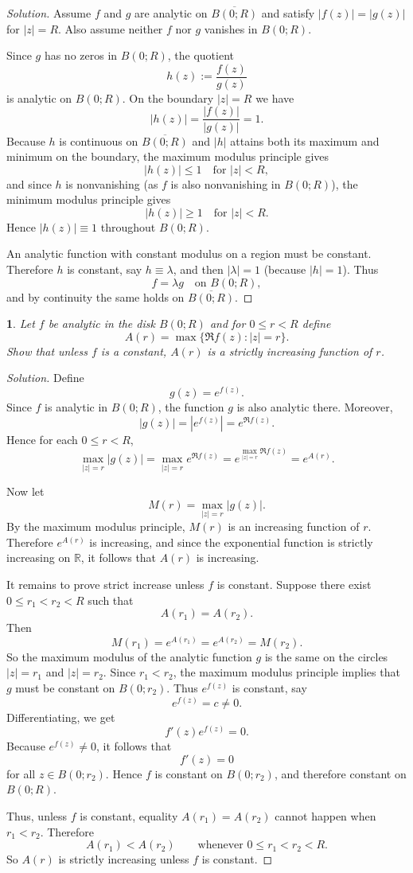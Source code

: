\documentclass[12pt, a4paper]{report}
\theoremstyle{spaced}
\newtheorem{exercise}{}
\newcommand{\setexercise}[1]{\setcounter{exercise}{#1-1}}
\begin{document}
\begin{proof}[Solution]
	Assume $f$ and $g$ are analytic on $\overline{B(0;R)}$ and satisfy $|f(z)|=|g(z)|$ for $|z|=R$. Also assume neither $f$ nor $g$ vanishes in $B(0;R)$.

	Since $g$ has no zeros in $B(0;R)$, the quotient
	\[
		h(z):=\frac{f(z)}{g(z)}
	\]
	is analytic on $B(0;R)$. On the boundary $|z|=R$ we have
	\[
		|h(z)|=\frac{|f(z)|}{|g(z)|}=1.
	\]
	Because $h$ is continuous on $\overline{B(0;R)}$ and $|h|$ attains both its maximum and minimum on the boundary, the maximum modulus principle gives
	\[
		|h(z)|\le 1 \quad \text{for } |z|<R,
	\]
	and since $h$ is nonvanishing (as $f$ is also nonvanishing in $B(0;R)$), the minimum modulus principle gives
	\[
		|h(z)|\ge 1 \quad \text{for } |z|<R.
	\]
	Hence $|h(z)|\equiv 1$ throughout $B(0;R)$.

	An analytic function with constant modulus on a region must be constant. Therefore $h$ is constant, say $h\equiv \lambda$, and then $|\lambda|=1$ (because $|h|=1$). Thus
	\[
		f=\lambda g \quad \text{on } B(0;R),
	\]
	and by continuity the same holds on $\overline{B(0;R)}$.
\end{proof}


\setexercise{7}
\begin{exercise}
	Let $f$ be analytic in the disk $B(0;R)$ and for $0 \le r < R$ define
	\[
		A(r) = \max \{ \Re f(z) : |z| = r \}.
	\]
	Show that unless $f$ is a constant, $A(r)$ is a strictly increasing function of $r$.
\end{exercise}

\begin{proof}[Solution]
	Define
	\[
		g(z)=e^{f(z)}.
	\]
	Since $f$ is analytic in $B(0;R)$, the function $g$ is also analytic there. Moreover,
	\[
		|g(z)|=|e^{f(z)}|=e^{\Re f(z)}.
	\]
	Hence for each $0\le r<R$,
	\[
		\max_{|z|=r}|g(z)|
		=\max_{|z|=r} e^{\Re f(z)}
		= e^{\max_{|z|=r}\Re f(z)}
		= e^{A(r)}.
	\]

	Now let
	\[
		M(r)=\max_{|z|=r}|g(z)|.
	\]
	By the maximum modulus principle, \(M(r)\) is an increasing function of \(r\). Therefore \(e^{A(r)}\) is increasing, and since the exponential function is strictly increasing on \(\mathbb R\), it follows that \(A(r)\) is increasing.

	It remains to prove strict increase unless \(f\) is constant. Suppose there exist \(0\le r_1<r_2<R\) such that
	\[
		A(r_1)=A(r_2).
	\]
	Then
	\[
		M(r_1)=e^{A(r_1)}=e^{A(r_2)}=M(r_2).
	\]
	So the maximum modulus of the analytic function \(g\) is the same on the circles \(|z|=r_1\) and \(|z|=r_2\). Since \(r_1<r_2\), the maximum modulus principle implies that \(g\) must be constant on \(B(0;r_2)\). Thus \(e^{f(z)}\) is constant, say
	\[
		e^{f(z)}=c \neq 0.
	\]
	Differentiating, we get
	\[
		f'(z)e^{f(z)}=0.
	\]
	Because \(e^{f(z)}\neq 0\), it follows that
	\[
		f'(z)=0
	\]
	for all \(z\in B(0;r_2)\). Hence \(f\) is constant on \(B(0;r_2)\), and therefore constant on \(B(0;R)\).

	Thus, unless \(f\) is constant, equality \(A(r_1)=A(r_2)\) cannot happen when \(r_1<r_2\). Therefore
	\[
		A(r_1)<A(r_2)\qquad\text{whenever }0\le r_1<r_2<R.
	\]
	So \(A(r)\) is strictly increasing unless \(f\) is constant.
\end{proof}
\end{document}
